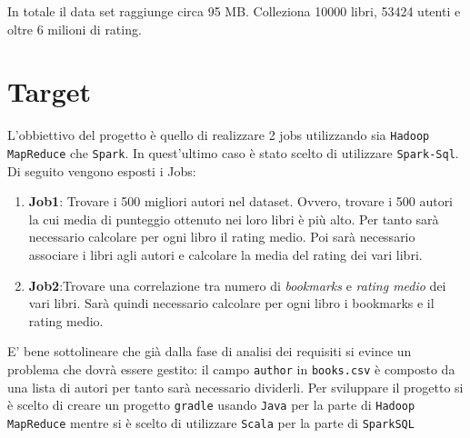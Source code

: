 \documentclass[11pt]{article}
\begin{document}
In totale il data set raggiunge circa 95 MB. Colleziona 10000 libri, 53424 utenti e
oltre 6 milioni di rating.

\section{Target}

L'obbiettivo del progetto è quello di realizzare 2 jobs utilizzando sia \texttt{Hadoop MapReduce} che
\texttt{Spark}. In quest'ultimo caso è stato scelto di utilizzare \texttt{Spark-Sql}. Di seguito
vengono esposti i Jobs:
    \begin{enumerate}
        \item \textbf{Job1}: Trovare i 500 migliori autori nel dataset. Ovvero, trovare i 500 autori la cui media di punteggio
            ottenuto nei loro libri è più alto. Per tanto sarà necessario calcolare per ogni libro il rating medio.
            Poi sarà necessario associare i libri agli autori e calcolare la media del rating dei vari libri.
        \item \textbf{Job2}:Trovare una correlazione tra numero di \textit{bookmarks} e \textit{rating medio} dei vari libri.
        Sarà quindi necessario calcolare per ogni libro i bookmarks e il rating medio.
    \end{enumerate}

E' bene sottolineare che già dalla fase di analisi dei requisiti si evince un problema che dovrà essere gestito: il campo
\texttt{author} in \texttt{books.csv} è composto da una lista di autori per tanto sarà necessario dividerli.
Per sviluppare il progetto si è scelto di creare un progetto \texttt{gradle} usando \texttt{Java} per la parte di
\texttt{Hadoop MapReduce} mentre si è scelto di utilizzare \texttt{Scala} per la parte di \texttt{SparkSQL}


\end{document}
